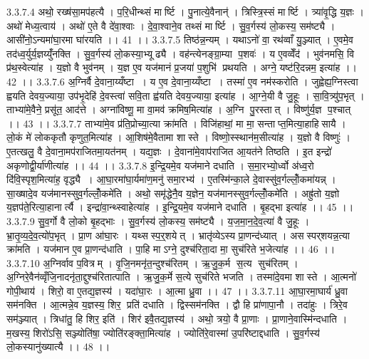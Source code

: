 3.3.7.4
अथो॒ रख्ष॑सा॒मप॑हत्यै । प॒रि॒धीन्थ्सं मार्ष्टि । पु॒नात्ये॒वैनान्॑ । त्रिस्त्रि॒स्सं मार्ष्टि । त्र्या॑वृ॒द्धि य॒ज्ञः । अथो॑ मेध्य॒त्वाय॑ । अथो॑ ए॒ते वै दे॑वा॒श्वाः । दे॒वा॒श्वाने॒व तथ्सं मार्ष्टि । सु॒व॒र्गस्य॑ लो॒कस्य॒ सम॑ष्ट्यै । आसी॑नो॒ऽन्यमा॑घा॒रमा घा॑रयति ।। 41 ।।
3.3.7.5
तिष्ठ॑न्न॒न्यम् । यथाऽनो॑ वा॒ रथ॑व्वाँ यु॒ञ्ज्यात् । ए॒वमे॒व तद॑ध्व॒र्युर्य॒ज्ञय्युँ॑नक्ति । सु॒व॒र्गस्य॑ लो॒कस्या॒भ्यूढ्यै । वह॑न्त्येनङ्ग्रा॒म्या प॒शवः॑ । य ए॒वव्वेँद॑ । भुव॑नमसि॒ वि प्र॑थ॒स्वेत्या॑ह । य॒ज्ञो वै भुव॑नम् । य॒ज्ञ ए॒व यज॑मानं प्र॒जया॑ प॒शुभि॑ प्रथयति । अग्ने॒ यष्ट॑रि॒दन्नम॒ इत्या॑ह ।। 42 ।।
3.3.7.6
अ॒ग्निर्वै दे॒वाना॒य्यँष्टा । य ए॒व दे॒वाना॒य्यँष्टा । तस्मा॑ ए॒व नम॑स्करोति । जुह्वेह्य॒ग्निस्त्वा ह्वयति देवय॒ज्याया॒ उप॑भृ॒देहि॑ दे॒वस्त्वा॑ सवि॒ता ह्व॑यति देवय॒ज्याया॒ इत्या॑ह । आ॒ग्ने॒यी वै जु॒हूः । सा॒वि॒त्र्यु॑प॒भृत् । ताभ्या॑मे॒वैने॒ प्रसू॑त॒ आद॑त्ते । अग्ना॑विष्णू॒ मा वा॒मव॑ क्रमिष॒मित्या॑ह । अ॒ग्नि पु॒रस्तात् । विष्णु॑र्य॒ज्ञ प॒श्चात् ।। 43 ।।
3.3.7.7
ताभ्या॑मे॒व प्र॑ति॒प्रोच्या॒त्या क्रा॑मति । विजि॑हाथां॒ मा मा॒ सन्ताप्त॒मित्या॒हाहि॑सायै । लो॒कं मे॑ लोककृतौ कृणुत॒मित्या॑ह । आ॒शिष॑मे॒वैतामा शास्ते । विष्णो॒स्स्थान॑म॒सीत्या॑ह । य॒ज्ञो वै विष्णुः॑ । ए॒तत्खलु॒ वै दे॒वाना॒मप॑राजितमा॒यत॑नम् । यद्य॒ज्ञः । दे॒वाना॑मे॒वाप॑राजित आ॒यत॑ने तिष्ठति । इ॒त इन्द्रो॑ अकृणोद्वी॒र्या॑णीत्या॑ह ।। 44 ।।
3.3.7.8
इ॒न्द्रि॒यमे॒व यज॑माने दधाति । स॒मा॒रभ्यो॒र्ध्वो अ॑ध्व॒रो दि॑वि॒स्पृश॒मित्या॑ह॒ वृद्ध्यै । आ॒घा॒रमा॑घा॒र्यमा॑ण॒मनु॑ समा॒रभ्य॑ । ए॒तस्मि॑न्का॒ले दे॒वास्सु॑व॒र्गल्लोँ॒कमा॑यन्न् । सा॒ख्षादे॒व यज॑मानस्सुव॒र्गल्लोँ॒कमे॑ति । अथो॒ समृ॑द्धेनै॒व य॒ज्ञेन॒ यज॑मानस्सुव॒र्गल्लोँ॒कमे॑ति । अह्रु॑तो य॒ज्ञो य॒ज्ञप॑ते॒रित्या॒हानार्त्यै । इन्द्रा॑वा॒न्थ्स्वाहेत्या॑ह । इ॒न्द्रि॒यमे॒व यज॑माने दधाति । बृ॒हद्भा इत्या॑ह ।। 45 ।।
3.3.7.9
सु॒व॒र्गो वै लो॒को बृ॒हद्भाः । सु॒व॒र्गस्य॑ लो॒कस्य॒ सम॑ष्ट्यै । य॒ज॒मा॒न॒दे॒व॒त्या॑ वै जु॒हूः । भ्रा॒तृ॒व्य॒दे॒व॒त्यो॑प॒भृत् । प्रा॒ण आ॑घा॒रः । यथ्स॑स्प॒र्॒शयेत् । भ्रातृ॑व्येऽस्य प्रा॒णन्द॑ध्यात् । अस॑स्पर्‌शयन्न॒त्या क्रा॑मति । यज॑मान ए॒व प्रा॒णन्द॑धाति । पा॒हि माऽग्ने॒ दुश्च॑रिता॒दा मा॒ सुच॑रिते भ॒जेत्या॑ह ।। 46 ।।
3.3.7.10
अ॒ग्निर्वाव प॒वित्रम् । वृ॒जि॒नमनृ॑त॒न्दुश्च॑रितम् । ऋ॒जु॒क॒र्म स॒त्य सुच॑रितम् । अ॒ग्निरे॒वैन॑व्वृँजि॒नादनृ॑ता॒द्दुश्च॑रितात्पाति । ऋ॒जु॒क॒र्मे स॒त्ये सुच॑रिते भजति । तस्मा॑दे॒वमा शास्ते । आ॒त्मनो॑ गोपी॒थाय॑ । शिरो॒ वा ए॒तद्य॒ज्ञस्य॑ । यदा॑घा॒रः । आ॒त्मा ध्रु॒वा ।। 47 ।।
3.3.7.11
आ॒घा॒रमा॒घार्य॑ ध्रु॒वा सम॑नक्ति । आ॒त्मन्ने॒व य॒ज्ञस्य॒ शिर॒ प्रति॑ दधाति । द्विस्सम॑नक्ति । द्वौ हि प्रा॑णापा॒नौ । तदा॑हुः । त्रिरे॒व सम॑ञ्ज्यात् । त्रिधा॑तु॒ हि शिर॒ इति॑ । शिर॑ इवै॒तद्य॒ज्ञस्य॑ । अथो॒ त्रयो॒ वै प्रा॒णाः । प्रा॒णाने॒वास्मि॑न्दधाति । म॒खस्य॒ शिरो॑ऽसि॒ सञ्ज्योति॑षा॒ ज्योति॑रङ्क्ता॒मित्या॑ह । ज्योति॑रे॒वास्मा॑ उ॒परि॑ष्टाद्दधाति । सु॒व॒र्गस्य॑ लो॒कस्यानु॑ख्यात्यै ।। 48 ।।
